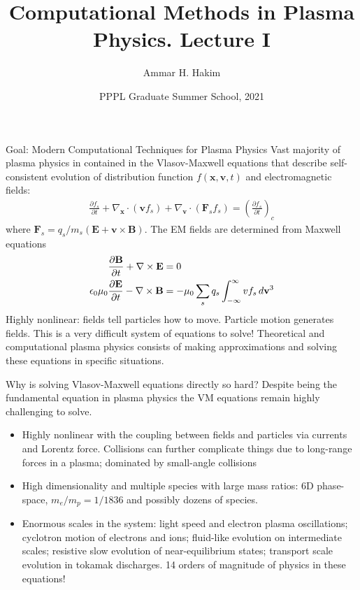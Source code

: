 \documentclass[pdf]{beamer}
\title[{\tt }] {Computational Methods in Plasma Physics. Lecture I}%
\author[http://cmpp.rtfd.io]%
{Ammar H. Hakim\inst{1}}%
\institute[PPPL]
{ \inst{1} Princeton Plasma Physics Laboratory, Princeton, NJ %
}
\date[8/16/2021]{PPPL Graduate Summer School, 2021}
\newcommand{\pfrac}[2]{\frac{\partial #1}{\partial #2}}
\newcommand{\mvec}[1]{\mathbf{#1}}
\newcommand{\gcs}{\nabla_{\mvec{x}}}
\newcommand{\gvs}{\nabla_{\mvec{v}}}
\theoremstyle{definition}
\begin{document}
\begin{frame}
  \titlepage
\end{frame}

\begin{frame}{Goal: Modern Computational Techniques for Plasma Physics}
  \footnotesize Vast majority of plasma physics in contained in the
  Vlasov-Maxwell equations that describe self-consistent evolution of
  distribution function $f(\mvec{x},\mvec{v},t)$ and electromagnetic
  fields:
  \begin{align*}
    \pfrac{f_s}{t} + \gcs\cdot (\mvec{v} f_s) + \gvs\cdot (\mvec{F}_s
    f_s) = \left( \pfrac{f_s}{t} \right)_c
  \end{align*}
  where $\mvec{F}_s=q_s/m_s (\mvec{E}+\mvec{v}\times\mvec{B})$. The EM
  fields are determined from Maxwell equations
  \begin{align*}
    \frac{\partial \mvec{B}}{\partial t} + \nabla\times\mvec{E} &= 0 \\
    \epsilon_0\mu_0\frac{\partial \mvec{E}}{\partial t} -
    \nabla\times\mvec{B} &= -\mu_0\sum_s q_s \int_{-\infty}^\infty v f_s \thinspace d\mvec{v}^3
  \end{align*}
  Highly nonlinear: fields tell particles how to move. Particle motion
  generates fields. This is a very difficult system of equations to
  solve! Theoretical and computational plasma physics consists of
  making approximations and solving these equations in specific
  situations.
\end{frame}

\begin{frame}{Why is solving Vlasov-Maxwell equations directly so
    hard?}
  Despite being the fundamental equation in plasma physics the VM
  equations remain highly challenging to solve.
  \begin{itemize}
  \item Highly nonlinear with the coupling between fields and
    particles via currents and Lorentz force. Collisions can further
    complicate things due to long-range forces in a plasma; dominated
    by small-angle collisions
  \item High dimensionality and multiple species with large mass
    ratios: 6D phase-space, $m_e/m_p = 1/1836$ and possibly dozens of
    species.
  \item Enormous scales in the system: light speed and electron plasma
    oscillations; cyclotron motion of electrons and ions; fluid-like
    evolution on intermediate scales; resistive slow evolution of
    near-equilibrium states; transport scale evolution in tokamak
    discharges.  14 orders of magnitude of physics in these
    equations!
  \end{itemize}
\end{frame}
\end{document}
